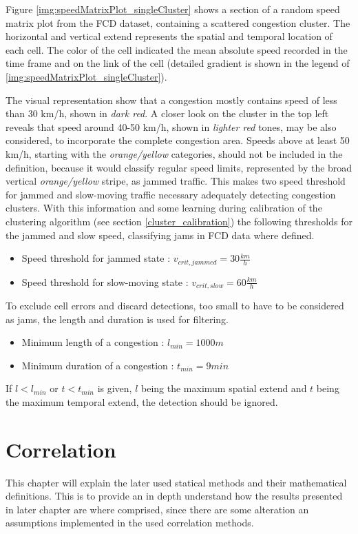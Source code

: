 \documentclass[a4paper,12pt]{report}
\begin{document}
Figure \ref{img:speedMatrixPlot_singleCluster} shows a section of a random speed matrix plot from the FCD dataset, containing a scattered congestion cluster. The horizontal and vertical extend represents the spatial and temporal location of each cell. The color of the cell indicated the mean absolute speed recorded in the time frame and on the link of the cell (detailed gradient is shown in the legend of \ref{img:speedMatrixPlot_singleCluster}).

The visual representation show that a congestion mostly contains speed of less than 30 km/h, shown in \textit{dark red}. A closer look on the cluster in the top left reveals that speed around 40-50 km/h, shown in \textit{lighter red} tones, may be also considered, to incorporate the complete congestion area. Speeds above at least 50 km/h, starting with the \textit{orange/yellow} categories, should not be included in the definition, because it would classify regular speed limits, represented by the broad vertical \textit{orange/yellow} stripe, as jammed traffic. This makes two speed threshold for jammed and slow-moving traffic necessary adequately detecting congestion clusters. With this information and some learning during calibration of the clustering algorithm (see section \ref{cluster_calibration}) the following thresholds for the jammed and slow speed, classifying \glspl{jam} in FCD data where defined.

\begin{itemize}
	\item Speed threshold for jammed state : $v_{crit,jammed} = 30 \frac{km}{h}$
	\item Speed threshold for slow-moving state : $v_{crit,slow} = 60 \frac{km}{h}$
\end{itemize}

To exclude cell errors and discard detections, too small to have to be considered as jams, the length and duration is used for filtering. 

\begin{itemize}
	\item Minimum length of a congestion : $l_{min} = 1000 m$
	\item Minimum duration of a congestion : $t_{min} = 9 min$
\end{itemize}

If $l < l_{min}$ or $t < t_{min}$ is given, $l$ being the maximum spatial extend and $t$ being the maximum temporal extend, the detection should be ignored.

\chapter{Correlation}
\label{definition_correlation}
This chapter will explain the later used statical methods and their mathematical definitions. This is to provide an in depth understand how the results presented in later chapter are where comprised, since there are some alteration an assumptions implemented in the used correlation methods.
\end{document}
